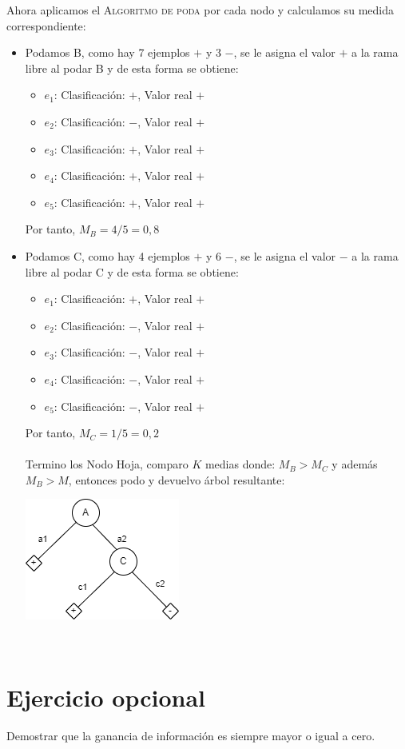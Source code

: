 \documentclass{article}
\begin{document}
Ahora aplicamos el \textsc{Algoritmo de poda} por cada nodo y calculamos su medida correspondiente:\\
\begin{itemize}
    \item Podamos B, como hay 7 ejemplos $+$ y 3 $-$, se le asigna el valor $+$ a la rama libre al podar B y de esta forma se obtiene:
    \begin{itemize}
        \item $e_1$: Clasificación: $+$, Valor real $+$
        \item $e_2$: Clasificación: $-$, Valor real $+$
        \item $e_3$: Clasificación: $+$, Valor real $+$
        \item $e_4$: Clasificación: $+$, Valor real $+$
        \item $e_5$: Clasificación: $+$, Valor real $+$
    \end{itemize}
    Por tanto, $M_B = 4/5 = 0,8$
    \item Podamos C, como hay 4 ejemplos $+$ y 6 $-$, se le asigna el valor $-$ a la rama libre al podar C y de esta forma se obtiene:
    \begin{itemize}
        \item $e_1$: Clasificación: $+$, Valor real $+$
        \item $e_2$: Clasificación: $-$, Valor real $+$
        \item $e_3$: Clasificación: $-$, Valor real $+$
        \item $e_4$: Clasificación: $-$, Valor real $+$
        \item $e_5$: Clasificación: $-$, Valor real $+$
    \end{itemize}
    Por tanto, $M_C = 1/5 = 0,2$\\\\
    Termino los Nodo Hoja, comparo $K$ medias donde: $M_B>M_C$ y además $M_B > M$, entonces podo y devuelvo árbol resultante:
    \begin{center}
        \includegraphics[scale=0.5]{arbol_2.png}
    \end{center}\\
\end{itemize}
\hline
\section*{Ejercicio opcional}
Demostrar que la ganancia de información es siempre mayor o igual a cero.
\end{document}
